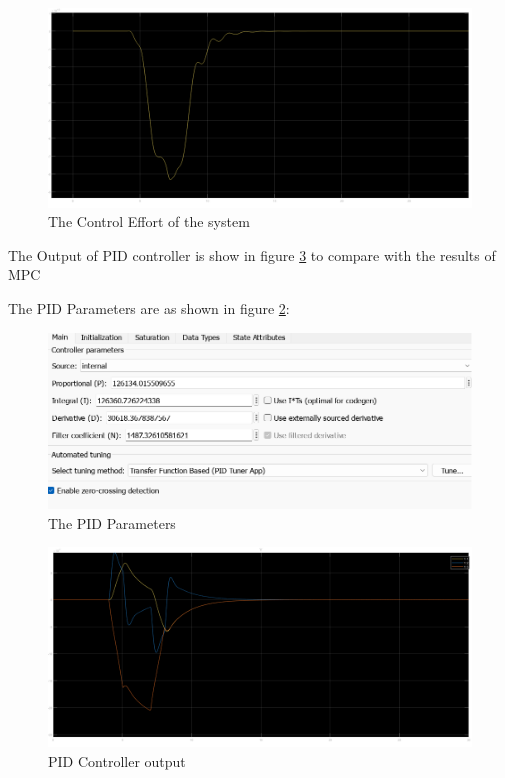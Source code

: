 \documentclass{article}
\begin{document}
\begin{figure}
    \centering
    \includegraphics[width=\linewidth]{images/Control Effort.png}
    \caption{The Control Effort of the system}
    \label{fig:enter-label}
\end{figure}

The Output of PID controller is show in figure \ref{fig:enter-labe1} to compare with the results of MPC

The PID Parameters are as shown in figure \ref{fig3}:

\begin{figure}
    \centering
    \includegraphics[width=\linewidth]{images/PID_Parameters.png}
    \caption{The PID Parameters}
    \label{fig3}
\end{figure}

\begin{figure}
    \centering
    \includegraphics[width=\linewidth]{images/PID_Controller_Output.png}
    \caption{PID Controller output}
    \label{fig:enter-labe1}
\end{figure}
\end{document}

